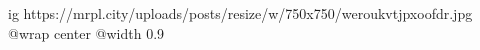  
 
 
 
 

\ifcmt
  ig https://mrpl.city/uploads/posts/resize/w/750x750/weroukvtjpxoofdr.jpg
  @wrap center
  @width 0.9
\fi
